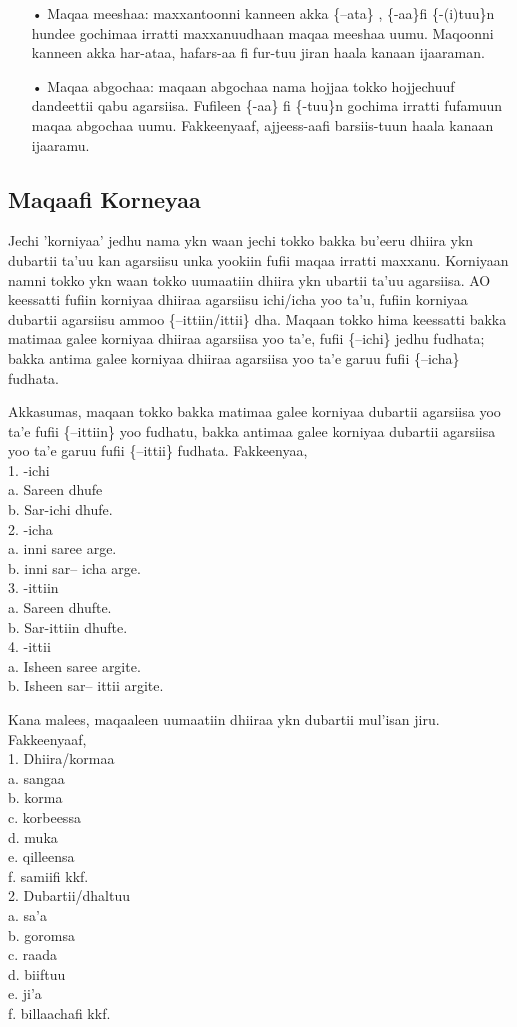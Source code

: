 \documentclass[11pt,b5paper]{book}
\begin{document}
\begin{itemize}
\item[•] Maqaa meeshaa: maxxantoonni kanneen akka \{–ata\} , \{-aa\}fi \{-(i)tuu\}n hundee gochimaa irratti maxxanuudhaan maqaa meeshaa uumu. Maqoonni kanneen akka har-ataa, hafars-aa fi fur-tuu jiran haala kanaan ijaaraman.

\item[•] Maqaa abgochaa: maqaan abgochaa nama hojjaa tokko hojjechuuf dandeettii qabu agarsiisa. Fufileen \{-aa\} fi \{-tuu\}n gochima irratti fufamuun maqaa abgochaa uumu. Fakkeenyaaf, ajjeess-aafi barsiis-tuun haala kanaan ijaaramu.
\end{itemize}

\subsection{Maqaafi Korneyaa}

Jechi 'korniyaa' jedhu nama ykn waan jechi tokko bakka bu'eeru dhiira ykn dubartii ta'uu kan agarsiisu unka yookiin fufii maqaa irratti maxxanu. Korniyaan namni tokko ykn waan tokko uumaatiin dhiira ykn ubartii ta'uu agarsiisa. AO keessatti fufiin korniyaa dhiiraa agarsiisu ichi/icha yoo ta'u, fufiin korniyaa dubartii agarsiisu ammoo \{–ittiin/ittii\} dha. Maqaan tokko hima keessatti bakka matimaa galee korniyaa dhiiraa agarsiisa yoo ta'e, fufii \{–ichi\} jedhu fudhata; bakka antima galee korniyaa dhiiraa agarsiisa yoo ta'e garuu fufii \{–icha\} fudhata. 

Akkasumas, maqaan tokko bakka matimaa galee korniyaa dubartii agarsiisa yoo ta'e fufii \{–ittiin\} yoo fudhatu, bakka antimaa galee korniyaa dubartii agarsiisa yoo ta'e garuu fufii \{–ittii\} fudhata. Fakkeenyaa,\\
1. -ichi\\
a. Sareen dhufe\\
b. Sar-ichi dhufe.\\
2. -icha\\
a. inni saree arge.\\
b. inni sar– icha arge.\\
3. -ittiin\\
a. Sareen dhufte.\\
b. Sar-ittiin dhufte.\\
4. -ittii\\
a. Isheen saree argite.\\
b. Isheen sar– ittii argite. 

Kana malees, maqaaleen uumaatiin dhiiraa ykn dubartii mul'isan jiru. Fakkeenyaaf,\\
1. Dhiira/kormaa\\
a. sangaa\\
b. korma\\
c. korbeessa\\
d. muka\\
e. qilleensa\\
f. samiifi kkf.\\
2. Dubartii/dhaltuu\\
a. sa'a\\
b. goromsa\\
c. raada\\
d. biiftuu\\
e. ji’a\\
f. billaachafi kkf.
\end{document}
